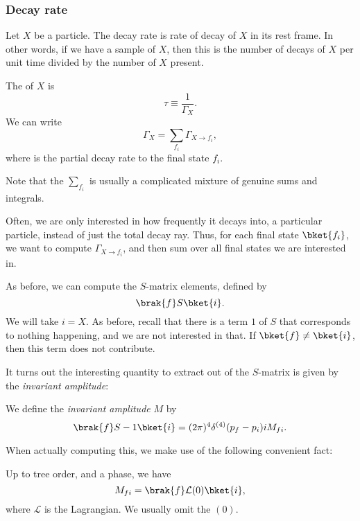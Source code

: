 \documentclass[a4paper]{article}
\begin{document}
\subsubsection*{Decay rate}
\begin{defi}
  Let $X$ be a particle. The decay rate  is rate of decay of $X$ in its rest frame. In other words, if we have a sample of $X$, then this is the number of decays of $X$ per unit time divided by the number of $X$ present.

  The  of $X$ is
  \[
    \tau \equiv \frac{1}{\Gamma_X}.
  \]
  We can write
  \[
    \Gamma_X = \sum_{f_i} \Gamma_{X \to f_i},
  \]
  where  is the partial decay rate to the final state $f_i$.
\end{defi}
Note that the $\sum_{f_i}$ is usually a complicated mixture of genuine sums and integrals.

Often, we are only interested in how frequently it decays into, a particular particle, instead of just the total decay ray. Thus, for each final state $\bket{f_i}$, we want to compute $\Gamma_{X \to f_i}$, and then sum over all final states we are interested in.

As before, we can compute the $S$-matrix elements, defined by
\[
  \brak{f} S\bket{i}.
\]
We will take $i = X$. As before, recall that there is a term $1$ of $S$ that corresponds to nothing happening, and we are not interested in that. If $\bket{f} \not= \bket{i}$, then this term does not contribute.

It turns out the interesting quantity to extract out of the $S$-matrix is given by the \emph{invariant amplitude}:
\begin{defi}
  We define the \emph{invariant amplitude} $M$ by
  \[
    \brak{f}S - 1 \bket{i} = (2\pi)^4 \delta^{(4)}(p_f - p_i) i M_{fi}.
  \]
\end{defi}
When actually computing this, we make use of the following convenient fact:
\begin{prop}
  Up to tree order, and a phase, we have
  \[
    M_{fi} = \brak{f} \mathcal{L}(0)\bket{i},
  \]
  where $\mathcal{L}$ is the Lagrangian. We usually omit the $(0)$.
\end{prop}
\end{document}
